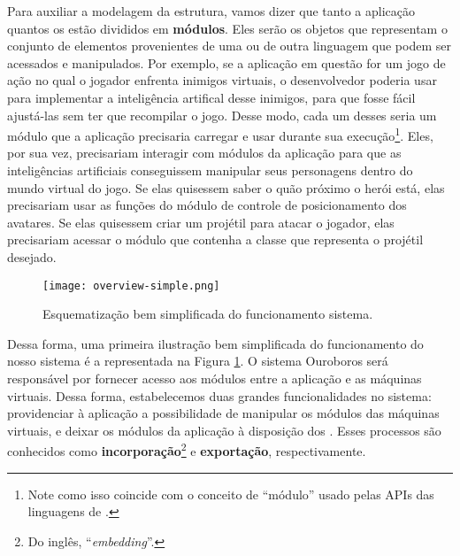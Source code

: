     Para auxiliar a modelagem da estrutura, vamos dizer que tanto a aplicação
    quantos os  estão divididos em \textbf{módulos}. Eles serão os
    objetos que representam o conjunto de elementos provenientes de uma ou de
    outra linguagem que podem ser acessados e manipulados. Por exemplo, se a
    aplicação em questão for um jogo de ação no qual o jogador enfrenta inimigos
    virtuais, o desenvolvedor poderia usar  para implementar a
    inteligência artifical desse inimigos, para que fosse fácil ajustá-las sem
    ter que recompilar o jogo. Desse modo, cada um desses  seria um
    módulo que a aplicação precisaria carregar e usar durante sua
    execução\footnote{ Note como isso coincide com o conceito de ``módulo''
    usado pelas APIs das linguagens de \script{}.}. Eles, por sua vez,
    precisariam interagir com módulos da aplicação para que as inteligências
    artificiais conseguissem manipular seus personagens dentro do mundo virtual
    do jogo. Se elas quisessem saber o quão próximo o herói está, elas
    precisariam usar as funções do módulo de controle de posicionamento dos
    avatares. Se elas quisessem criar um projétil para atacar o jogador, elas
    precisariam acessar o módulo que contenha a classe\footnotemark{} que
    representa o projétil desejado.


    \begin{figure}[ht]
      \centering
      \texttt{[image: overview-simple.png]}
      \caption{Esquematização bem simplificada do funcionamento sistema.}
      \label{fig:overview-simple}
    \end{figure}

    Dessa forma, uma primeira ilustração bem simplificada do funcionamento do
    nosso sistema é a representada na Figura \ref{fig:overview-simple}. O
    sistema Ouroboros será responsável por fornecer acesso aos módulos entre a
    aplicação e as máquinas virtuais. Dessa forma, estabelecemos duas
    grandes funcionalidades no sistema: providenciar à aplicação a possibilidade
    de manipular os módulos das máquinas virtuais, e deixar os módulos da
    aplicação à disposição dos  . Esses processos são conhecidos como
    \textbf{incorporação}\footnote{Do inglês, ``\textit{embedding}''.} e
    \textbf{exportação}, respectivamente.

